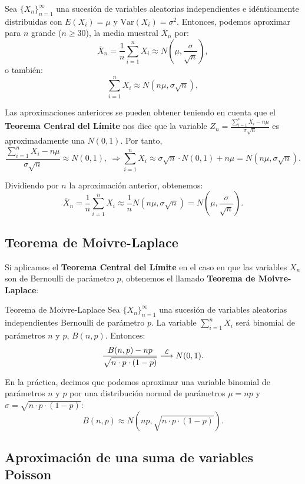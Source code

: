 \documentclass[]{book}
\begin{document}
Sea \(\{X_n\}_{n=1}^\infty\) una sucesión de variables aleatorias independientes e idénticamente distribuidas con \(E(X_i)=\mu\) y \(\mathrm{Var}(X_i)=\sigma^2\). Entonces, podemos aproximar para \(n\) grande (\(n\geq 30\)), la media muestral \(\overline{X}_n\) por:
\[
\overline{X}_n =\frac{1}{n}\sum_{i=1}^n X_i \approx N\left(\mu,\frac{\sigma}{\sqrt{n}}\right),
\]
o también:
\[
\sum_{i=1}^n X_i \approx N\left(n\mu,\sigma\sqrt{n}\right),
\]

Las aproximaciones anteriores se pueden obtener teniendo en cuenta que el \textbf{Teorema Central del Límite} nos dice que la variable
\(Z_n= \frac{\sum\limits_{i=1}^n X_i-n\mu}{\sigma\sqrt{n}}\) es aproximadamente una \(N(0,1)\). Por tanto,
\[
\frac{\sum\limits_{i=1}^n X_i-n\mu}{\sigma\sqrt{n}} \approx N(0,1),\ \Rightarrow \sum_{i=1}^n X_i\approx \sigma\sqrt{n}\cdot N(0,1)+n\mu = N\left(n\mu,\sigma\sqrt{n}\right).
\]

Dividiendo por \(n\) la aproximación anterior, obtenemos:
\[
\overline{X}_n =\frac{1}{n}\sum_{i=1}^n X_i \approx \frac{1}{n}N\left(n\mu,\sigma\sqrt{n}\right) =N\left(\mu,\frac{\sigma}{\sqrt{n}}\right).
\]

\hypertarget{teorema-de-moivre-laplace}{%
\subsection{Teorema de Moivre-Laplace}\label{teorema-de-moivre-laplace}}

Si aplicamos el \textbf{Teorema Central del Límite} en el caso en que las variables \(X_n\) son de Bernoulli de parámetro \(p\), obtenemos el llamado \textbf{Teorema de Moivre-Laplace}:

Teorema de Moivre-Laplace
Sea \(\{X_n\}_{n=1}^\infty\) una sucesión de variables aleatorias independientes Bernoulli de parámetro \(p\). La variable \(\sum\limits_{i=1}^n X_i\) será binomial de parámetros \(n\) y \(p\), \(B(n,p)\). Entonces:
\[
\frac{B(n,p)-np}{\sqrt{n\cdot p\cdot (1-p)}}\stackrel{{\cal L}}{\longrightarrow} N(0,1).
\]

En la práctica, decimos que podemos aproximar una variable binomial de parámetros \(n\) y \(p\) por una distribución normal de parámetros \(\mu=np\) y \(\sigma =\sqrt{n\cdot p\cdot (1-p)}\):
\[
B(n,p)\approx N(np,\sqrt{n\cdot p\cdot (1-p)}).
\]

\hypertarget{aproximaciuxf3n-de-una-suma-de-variables-poisson}{%
\subsection{Aproximación de una suma de variables Poisson}\label{aproximaciuxf3n-de-una-suma-de-variables-poisson}}
\end{document}
